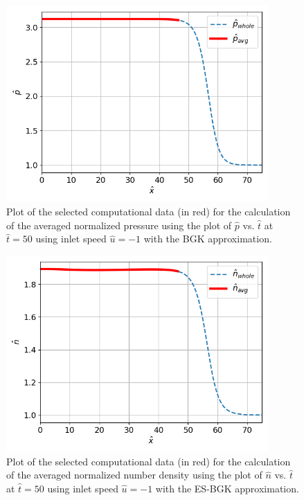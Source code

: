 \documentclass[a4paper]{article}
\begin{document}
\begin{figure}[hbt!]
    \centering
    \includegraphics[width=10cm]{plots/problem_h_BGK_p.png}
    \caption{\centering Plot of the selected computational data (in red) for the calculation of the averaged normalized pressure using the plot of $\hat{p}$ vs. $\hat{t}$ at $\hat{t} = 50$ using inlet speed $\hat{u} = -1$ with the BGK approximation.}
    \label{problem_h_BGK_p}
\end{figure}
\begin{figure}[hbt!]
    \centering
    \includegraphics[width=10cm]{plots/problem_h_ESBGK_n.png}
    \caption{\centering Plot of the selected computational data (in red) for the calculation of the averaged normalized number density using the plot of $\hat{n}$ vs. $\hat{t}$ at $\hat{t} = 50$ using inlet speed $\hat{u} = -1$ with the ES-BGK approximation.}
    \label{problem_h_ESBGK_n}
\end{figure}
\end{document}
